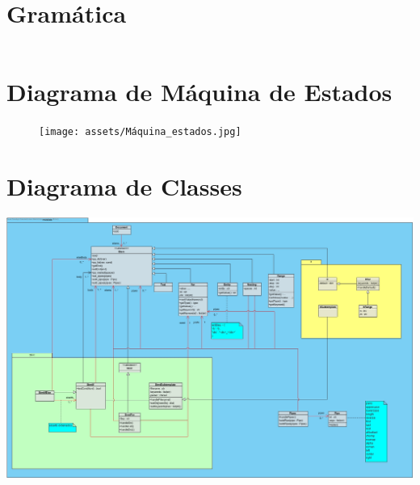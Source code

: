\documentclass[11pt]{report}
\begin{document}
\section{Gramática} \label{fig:grammar}
\inputminted{bash}{assets/gramatica.txt}

\section{Diagrama de Máquina de Estados}
\begin{figure}
    \centering
    \texttt{[image: assets/Máquina\_estados.jpg]}
\end{figure}

\section{Diagrama de Classes}
\begin{landscape}
    \centering
    \includegraphics[width=\linewidth]{assets/class_diagram.jpg}
\end{landscape}
%
%
%
% 
% 


\end{document}
